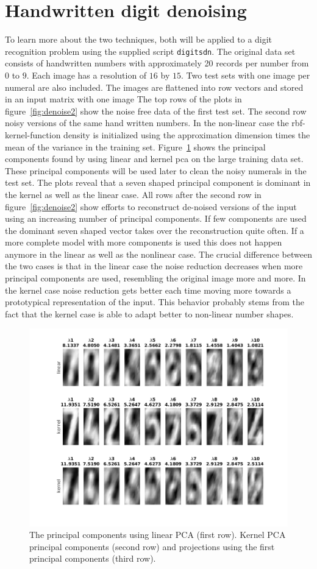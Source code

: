 \section{Handwritten digit denoising}
To learn more about the two techniques, both will be applied to a digit recognition problem using the supplied script \texttt{digitsdn}. The original data set consists of handwritten numbers with approximately 20 records per number from $0$ to $9$. Each image has a resolution of $16$ by $15$. Two test sets with one image per numeral are also included. The images are flattened into row vectors and stored in an input matrix with one image The top rows of the plots in figure~\ref{fig:denoise2} show the noise free data of the first test set. The second row noisy versions of the same hand written numbers. 
In the non-linear case the rbf-kernel-function density is initialized using the approximation dimension times the mean of the variance in the training set. Figure~\ref{fig:pcKerLin} shows the principal components found by using linear and kernel pca on the large training data set. These principal components will be used later to clean the noisy numerals in the test set. The plots reveal that a seven shaped principal component is dominant in the kernel as well as the linear case. All rows after the second row in figure~\ref{fig:denoise2} show efforts to reconstruct de-noised versions of the input using an increasing number of principal components. If few components are used the dominant seven shaped vector takes over the reconstruction quite often. If a more complete model with more components is used this does not happen anymore in the linear as well as the nonlinear case. The crucial difference between the two cases is that in the linear case the noise reduction decreases when more principal components are used, resembling the original image more and more. In the kernel case noise reduction gets better each time moving more towards a prototypical representation of the input. This behavior probably stems from the fact that the kernel case is able to adapt better to non-linear number shapes. 
\begin{figure}
\centering
\includegraphics[width=0.7\linewidth]{../src/figure/pcKerLin}
\caption{The principal components using linear PCA (first row). Kernel PCA principal components (second row) and projections using the first principal components (third row).}
\label{fig:pcKerLin}
\end{figure}
